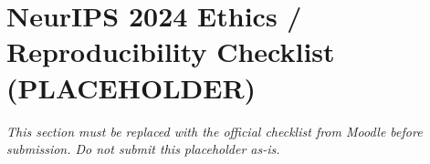 %

\section*{NeurIPS 2024 Ethics / Reproducibility Checklist (PLACEHOLDER)}
\textit{This section must be replaced with the official checklist from
Moodle before submission. Do not submit this placeholder as-is.}
